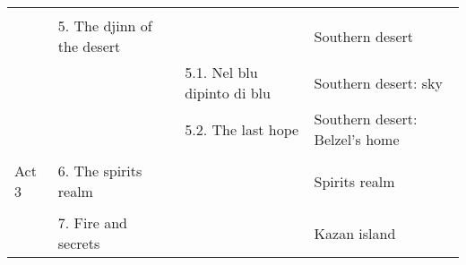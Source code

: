 \begin{table}[H]
{\begin{tabular}{|llll|}
\multicolumn{1}{|l|}{} &  &  &  \\ \cline{2-4} 
\multicolumn{1}{|l|}{} & \multicolumn{1}{l|}{5. The djinn of the desert} & \multicolumn{1}{l|}{} & Southern desert \\ \cline{2-4} 
\multicolumn{1}{|l|}{} & \multicolumn{1}{l|}{} & \multicolumn{1}{l|}{5.1. Nel blu dipinto di blu} & Southern desert: sky \\ \cline{3-4} 
\multicolumn{1}{|l|}{} & \multicolumn{1}{l|}{} & \multicolumn{1}{l|}{5.2. The last hope} & Southern desert: Belzel's home \\ \hline
 &  &  &  \\ \hline
\multicolumn{1}{|l|}{\cellcolor[HTML]{C0C0C0}Act 3} & \multicolumn{1}{l|}{6. The spirits realm} & \multicolumn{1}{l|}{} & Spirits realm \\ \hline
\multicolumn{1}{|l|}{} &  &  &  \\ \cline{2-4} 
\multicolumn{1}{|l|}{} & \multicolumn{1}{l|}{7. Fire and secrets} & \multicolumn{1}{l|}{} & Kazan island \\ \hline

\end{tabular}%
}
\end{table}